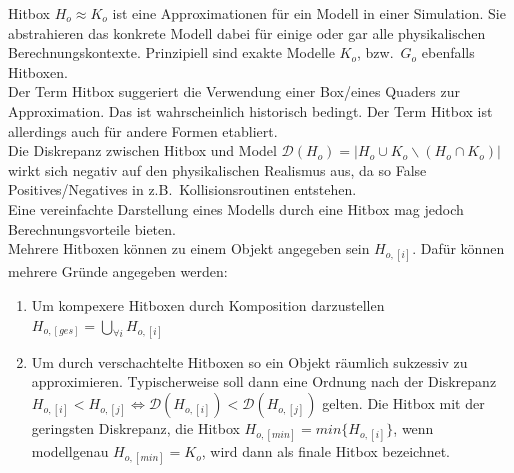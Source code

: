 \label{sec:hitbox}
Hitbox $H_o \approx K_o$ ist eine Approximationen für ein Modell in einer Simulation. Sie abstrahieren das konkrete Modell dabei für einige oder gar alle physikalischen Berechnungskontexte. Prinzipiell sind exakte Modelle $K_o$, bzw.~$G_o$ ebenfalls Hitboxen.\\
Der Term Hitbox suggeriert die Verwendung einer Box/eines Quaders zur Approximation. Das ist wahrscheinlich historisch bedingt. Der Term Hitbox ist allerdings auch für andere Formen etabliert.\\
Die Diskrepanz zwischen Hitbox und Model $\mathcal{D}(H_o) = | H_o \cup K_o \backslash (H_o \cap K_o) |$ wirkt sich negativ auf den physikalischen Realismus aus, da so False Positives/Negatives  in z.B.~Kollisionsroutinen entstehen.\\
Eine vereinfachte Darstellung eines Modells durch eine Hitbox mag jedoch Berechnungsvorteile bieten.\\
Mehrere Hitboxen können zu einem Objekt angegeben sein $H_{o, [i]}$. Dafür können mehrere Gründe angegeben werden:
\begin{enumerate}
\item Um kompexere Hitboxen durch Komposition darzustellen $H_{o, [ges]} = \bigcup_{\forall i}H_{o, [i]}$
\item Um durch verschachtelte Hitboxen so ein Objekt räumlich sukzessiv zu approximieren.
Typischerweise soll dann eine Ordnung nach der Diskrepanz $H_{o, [i]} < H_{o, [j]} \Leftrightarrow \mathcal{D}(H_{o, [i]}) < \mathcal{D}(H_{o, [j]})$ gelten. Die Hitbox mit der geringsten Diskrepanz, die Hitbox $H_{o, [min]}=min\{H_{o, [i]}\}$, wenn modellgenau $H_{o, [min]} = K_o$, wird dann als finale Hitbox bezeichnet.
\end{enumerate}

